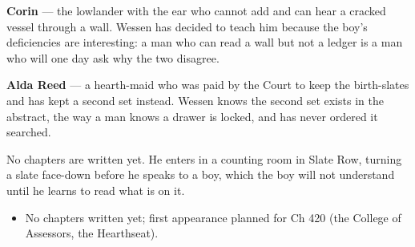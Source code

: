 \documentclass{design/chronicle}
\begin{document}
{\textbf{Corin} — the lowlander with the ear who cannot add and can hear a cracked vessel through a wall. Wessen has decided to teach him because the boy’s deficiencies are interesting: a man who can read a wall but not a ledger is a man who will one day ask why the two disagree.

\textbf{Alda Reed} — a hearth-maid who was paid by the Court to keep the birth-slates and has kept a second set instead. Wessen knows the second set exists in the abstract, the way a man knows a drawer is locked, and has never ordered it searched.

No chapters are written yet. He enters in a counting room in Slate Row, turning a slate face-down before he speaks to a boy, which the boy will not understand until he learns to read what is on it.

\begin{itemize}[leftmargin=1.4em,itemsep=1pt,topsep=3pt,parsep=0pt]

\item No chapters written yet; first appearance planned for Ch 420 (the College of Assessors, the Hearthseat).

\end{itemize}
}
\end{document}
